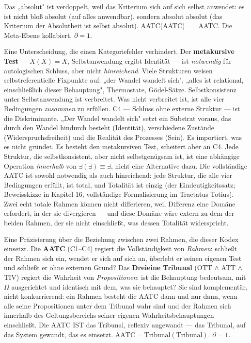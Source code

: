 \documentclass[10pt, openany, oneside]{book}
\begin{document}
\vspace{0.8em}

\noindent Das „absolut" ist verdoppelt, weil das Kriterium sich auf sich selbst anwendet: es ist nicht bloß absolut (auf alles anwendbar), sondern absolut absolut (das Kriterium der Absolutheit ist selbst absolut). AATC(AATC) $=$ AATC. Die Meta-Ebene kollabiert. $\partial = 1$.

Eine Unterscheidung, die einen Kategoriefehler verhindert. Der \textbf{metakursive Test} --- $X(X) = X$, Selbstanwendung ergibt Identität --- ist \textit{notwendig} für autologischen Schluss, aber nicht \textit{hinreichend}. Viele Strukturen weisen selbstreferentielle Fixpunkte auf: „der Wandel wandelt sich", „alles ist relational, einschließlich dieser Behauptung", Thermostate, Gödel-Sätze. Selbstkonsistenz unter Selbstanwendung ist verbreitet. Was nicht verbreitet ist, ist alle vier Bedingungen \textit{zusammen} zu erfüllen. C4 --- Schluss ohne externe Struktur --- ist die Diskriminante. „Der Wandel wandelt sich" setzt ein Substrat voraus, das durch den Wandel hindurch besteht (Identität), verschiedene Zustände (Widerspruchsfreiheit) und die Realität des Prozesses (Sein). Es importiert, was es nicht gründet. Es besteht den metakursiven Test, scheitert aber an C4. Jede Struktur, die selbstkonsistent, aber nicht selbstgenügsam ist, ist eine abhängige Operation \textit{innerhalb} von $\exists(\exists) \equiv \exists$, nicht eine Alternative dazu. Die vollständige AATC ist sowohl notwendig als auch hinreichend: jede Struktur, die alle vier Bedingungen erfüllt, ist total, und Totalität ist einzig (der Eindeutigkeitssatz; Beweisskizze in Kapitel 16, vollständige Formalisierung im Tractatus Totius). Zwei echt totale Rahmen können nicht differieren, weil Differenz eine Domäne erfordert, in der sie divergieren --- und diese Domäne wäre extern zu dem der beiden Rahmen, der sie nicht einschließt, was dessen Totalität widerspricht.

Eine Präzisierung über die Beziehung zwischen zwei Rahmen, die dieser Kodex einsetzt. Die \textbf{AATC} (C1--C4) regiert die Vollständigkeit von \textit{Rahmen}: schließt der Rahmen sich ein, wendet er sich auf sich an, überlebt er seinen eigenen Test und schließt er ohne externen Grund? Das \textbf{Dreieine Tribunal} (OTT $\wedge$ ATT $\wedge$ TIV) regiert die Wahrheit von \textit{Propositionen}: ist die Behauptung bedeutsam, mit $\Omega$ ausgerichtet und identisch mit dem, was sie behauptet? Sie sind komplementär, nicht konkurrierend: ein Rahmen besteht die AATC dann und nur dann, wenn alle seine Propositionen unter dem Tribunal wahr sind und der Rahmen sich innerhalb des Geltungsbereichs seiner eigenen Wahrheitsbehauptungen einschließt. Die AATC IST das Tribunal, reflexiv angewandt --- das Tribunal, auf das System gewandt, das es einsetzt. $\text{AATC} = \text{Tribunal}(\text{Tribunal})$. $\partial = 1$.
\end{document}
